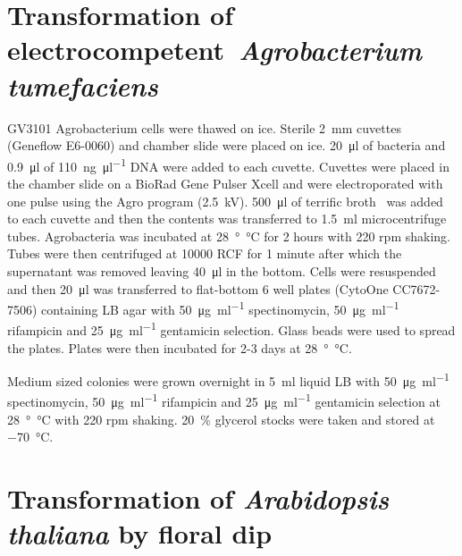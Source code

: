 \documentclass[../main.tex]{subfiles}
\begin{document}
\section{Transformation of electrocompetent~\textit{Agrobacterium tumefaciens}}

GV3101 Agrobacterium cells were thawed on ice.
Sterile \SI{2}{\mm} cuvettes (Geneflow E6-0060) and chamber slide were placed on ice.
\SI{20}{\micro\litre} of bacteria and \SI{0.9}{\micro\litre} of \SI{110}{\nano\gram\per\micro\litre} DNA were added to each cuvette.
Cuvettes were placed in the chamber slide on a BioRad Gene Pulser Xcell and were electroporated with one pulse using the Agro program (\SI{2.5}{\kilo\volt}).
\SI{500}{\micro\litre} of terrific broth~\autocite{tartoffImprovedMediaGrowing} was added to each cuvette and then the contents was transferred to \SI{1.5}{\ml} microcentrifuge tubes.
Agrobacteria was incubated at \SI{28}{\degree\celsius} for 2 hours with 220 rpm shaking.
Tubes were then centrifuged at 10000 RCF for 1 minute after which the supernatant was removed leaving \SI{40}{\micro\litre} in the bottom.
Cells were resuspended and then \SI{20}{\micro\litre} was transferred to flat-bottom 6 well plates (CytoOne CC7672-7506) containing LB agar with \SI{50}{\micro\gram\per\ml} spectinomycin, \SI{50}{\micro\gram\per\ml} rifampicin and \SI{25}{\micro\gram\per\ml} gentamicin selection.
Glass beads were used to spread the plates.
Plates were then incubated for 2-3 days at \SI{28}{\degree\celsius}.

Medium sized colonies were grown overnight in \SI{5}{\ml} liquid LB with \SI{50}{\micro\gram\per\ml} spectinomycin, \SI{50}{\micro\gram\per\ml} rifampicin and \SI{25}{\micro\gram\per\ml} gentamicin selection at \SI{28}{\degree\celsius} with 220 rpm shaking.
\SI{20}{\percent} glycerol stocks were taken and stored at \SI{-70}{\degreeCelsius}.

\section{Transformation of \textit{Arabidopsis thaliana} by floral dip}\label{chapter2:methods:floral-dip}
\end{document}
